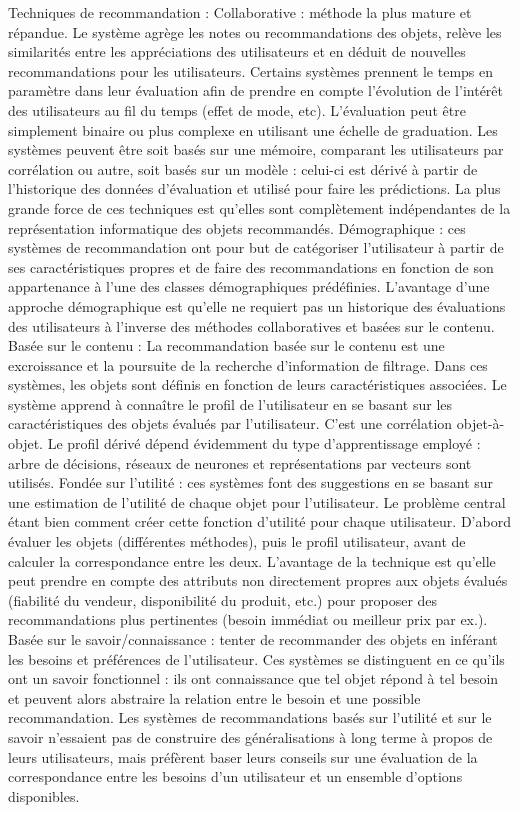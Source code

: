 Techniques de recommandation :
Collaborative : méthode la plus mature et répandue. Le système agrège les notes ou recommandations des objets, relève les similarités entre les appréciations des utilisateurs et en déduit de nouvelles recommandations pour les utilisateurs. Certains systèmes prennent le temps en paramètre dans leur évaluation afin de prendre en compte l’évolution de l’intérêt des utilisateurs au fil du temps (effet de mode, etc). L’évaluation peut être simplement binaire ou plus complexe en utilisant une échelle de graduation. Les systèmes peuvent être soit basés sur une mémoire, comparant les utilisateurs par corrélation ou autre, soit basés sur un modèle :  celui-ci est dérivé à partir de l'historique des données d'évaluation et utilisé pour faire les prédictions.
La plus grande force de ces techniques est qu’elles sont complètement indépendantes de la représentation informatique des objets recommandés.
Démographique : ces systèmes de recommandation ont pour but de catégoriser l’utilisateur à partir de ses caractéristiques propres et de faire des recommandations en fonction de son appartenance à l’une des classes démographiques prédéfinies. L’avantage d’une approche démographique est qu’elle ne requiert pas un historique des évaluations des utilisateurs à l’inverse des méthodes collaboratives et basées sur le contenu.
Basée sur le contenu : La recommandation basée sur le contenu est une excroissance et la poursuite de la recherche d'information de filtrage. Dans ces systèmes, les objets sont définis en fonction de leurs caractéristiques associées. Le système apprend à connaître le profil de l’utilisateur en se basant sur les caractéristiques des objets évalués par l’utilisateur. C’est une corrélation objet-à-objet. Le profil dérivé dépend évidemment du type d’apprentissage employé : arbre de décisions, réseaux de neurones et représentations par vecteurs sont utilisés.
Fondée sur l’utilité : ces systèmes font des suggestions en se basant sur une estimation de l’utilité de chaque objet pour l’utilisateur. Le problème central étant bien comment créer cette fonction d’utilité pour chaque utilisateur. D’abord évaluer les objets (différentes méthodes), puis le profil utilisateur, avant de calculer la correspondance entre les deux. L’avantage de la technique est qu’elle peut prendre en compte des attributs non directement propres aux objets évalués (fiabilité du vendeur, disponibilité du produit, etc.) pour proposer des recommandations plus pertinentes (besoin immédiat ou meilleur prix par ex.).
Basée sur le savoir/connaissance : tenter de recommander des objets en inférant les besoins et préférences de l’utilisateur. Ces systèmes se distinguent en ce qu’ils ont un savoir fonctionnel : ils ont connaissance que tel objet répond à tel besoin et peuvent alors abstraire la relation entre le besoin et une possible recommandation.
Les systèmes de recommandations basés sur l’utilité et sur le savoir n’essaient pas de construire des généralisations à long terme à propos de leurs utilisateurs, mais préfèrent baser leurs conseils sur une évaluation de la correspondance entre les besoins d’un utilisateur et un ensemble d’options disponibles.


